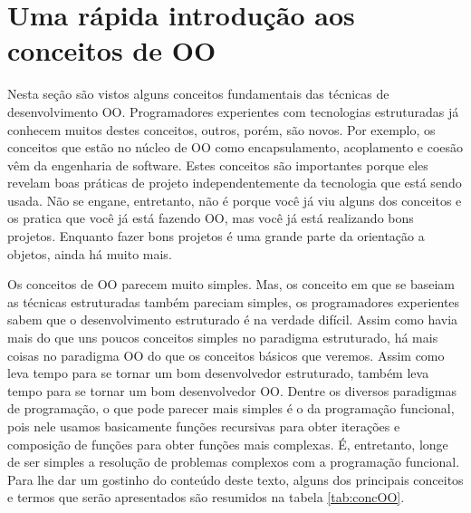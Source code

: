 \section{Uma rápida introdução aos conceitos de OO}

Nesta seção são vistos alguns conceitos fundamentais das técnicas de desenvolvimento OO. Programadores experientes com tecnologias estruturadas já conhecem muitos destes conceitos, outros, porém, são novos. Por exemplo, os conceitos que estão no núcleo de OO como encapsulamento, acoplamento e coesão vêm da engenharia de software. Estes conceitos são importantes porque eles revelam boas práticas de projeto independentemente da tecnologia que está sendo usada. Não se engane, entretanto, não é porque você já viu alguns dos conceitos e os pratica que você já está fazendo OO, mas você já está realizando bons projetos. Enquanto fazer bons projetos é uma grande parte da orientação a objetos, ainda há muito mais.

Os conceitos de OO parecem muito simples. Mas, os conceito em que se baseiam as técnicas estruturadas também pareciam simples, os programadores experientes sabem que o desenvolvimento estruturado é na verdade difícil. Assim como havia mais do que uns poucos conceitos simples no paradigma estruturado, há mais coisas no paradigma OO do que os conceitos básicos que veremos. Assim como leva tempo para se tornar um bom desenvolvedor estruturado, também leva tempo para se tornar um bom desenvolvedor OO. Dentre os diversos paradigmas de programação, o que pode parecer mais simples é o da programação funcional, pois nele usamos basicamente funções recursivas para obter iterações e composição de funções para obter funções mais complexas. É, entretanto, longe de ser simples a resolução de problemas complexos com a programação funcional. Para lhe dar um gostinho do conteúdo deste texto, alguns dos principais conceitos e termos que serão apresentados são resumidos na tabela \ref{tab:concOO}.

